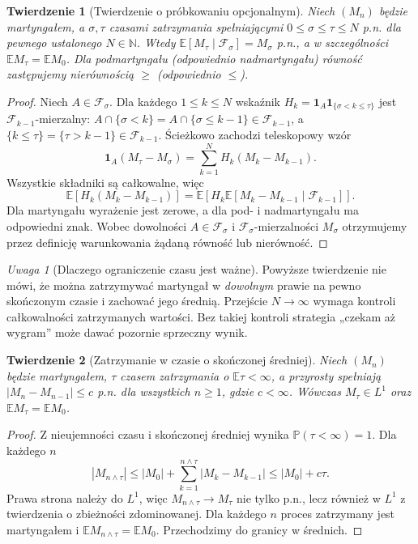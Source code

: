 \documentclass[11pt,a4paper,oneside]{report}
\numberwithin{equation}{chapter}
\theoremstyle{plain}
\newtheorem{twierdzenie}{Twierdzenie}[chapter]
\theoremstyle{definition}
\theoremstyle{remark}
\newtheorem{uwaga}{Uwaga}[chapter]
\newcommand{\N}{\mathbb{N}}
\newcommand{\Prob}{\mathbb{P}}
\newcommand{\E}{\mathbb{E}}
\newcommand{\ind}[1]{\mathbf{1}_{#1}}
\begin{document}
\begin{twierdzenie}[Twierdzenie o próbkowaniu opcjonalnym]
Niech $(M_n)$ będzie martyngałem, a $\sigma,\tau$
czasami zatrzymania spełniającymi
$0\leq\sigma\leq\tau\leq N$ p.n. dla pewnego
ustalonego $N\in\N$. Wtedy
$\E[M_\tau\mid\mathcal F_\sigma]=M_\sigma$ p.n.,
a w szczególności $\E M_\tau=\E M_0$.
Dla podmartyngału (odpowiednio nadmartyngału)
równość zastępujemy nierównością $\geq$
(odpowiednio $\leq$).
\end{twierdzenie}
\begin{proof}
Niech $A\in\mathcal F_\sigma$.
Dla każdego $1\leq k\leq N$ wskaźnik
$H_k=\ind A\ind{\{\sigma<k\leq\tau\}}$
jest $\mathcal F_{k-1}$-mierzalny:
$A\cap\{\sigma<k\}=A\cap\{\sigma\leq k-1\}
\in\mathcal F_{k-1}$,
a $\{k\leq\tau\}=\{\tau>k-1\}\in\mathcal F_{k-1}$.
Ścieżkowo zachodzi teleskopowy wzór
\[
\ind A(M_\tau-M_\sigma)
=\sum_{k=1}^N H_k(M_k-M_{k-1}).
\]
Wszystkie składniki są całkowalne, więc
\[
\E[H_k(M_k-M_{k-1})]
=\E[H_k\E[M_k-M_{k-1}\mid\mathcal F_{k-1}]].
\]
Dla martyngału wyrażenie jest zerowe,
a dla pod- i nadmartyngału ma odpowiedni znak.
Wobec dowolności $A\in\mathcal F_\sigma$
i $\mathcal F_\sigma$-mierzalności $M_\sigma$
otrzymujemy przez definicję warunkowania
żądaną równość lub nierówność.
\end{proof}

\begin{uwaga}[Dlaczego ograniczenie czasu jest ważne]
Powyższe twierdzenie nie mówi, że można zatrzymywać
martyngał w \emph{dowolnym} prawie na pewno
skończonym czasie i zachować jego średnią.
Przejście $N\to\infty$ wymaga kontroli
całkowalności zatrzymanych wartości.
Bez takiej kontroli strategia „czekam aż wygram”
może dawać pozornie sprzeczny wynik.
\end{uwaga}

\begin{twierdzenie}[Zatrzymanie w czasie o skończonej średniej]
Niech $(M_n)$ będzie martyngałem, $\tau$
czasem zatrzymania o $\E\tau<\infty$,
a przyrosty spełniają
$|M_n-M_{n-1}|\leq c$ p.n. dla wszystkich $n\geq1$,
gdzie $c<\infty$. Wówczas $M_\tau\in L^1$
oraz $\E M_\tau=\E M_0$.
\end{twierdzenie}
\begin{proof}
Z nieujemności czasu i skończonej średniej
wynika $\Prob(\tau<\infty)=1$. Dla każdego $n$
\[
|M_{n\wedge\tau}|
\leq|M_0|+\sum_{k=1}^{n\wedge\tau}|M_k-M_{k-1}|
\leq |M_0|+c\tau.
\]
Prawa strona należy do $L^1$, więc
$M_{n\wedge\tau}\to M_\tau$ nie tylko p.n.,
lecz również w $L^1$ z twierdzenia o zbieżności
zdominowanej. Dla każdego $n$ proces zatrzymany
jest martyngałem i $\E M_{n\wedge\tau}=\E M_0$.
Przechodzimy do granicy w średnich.
\end{proof}
\end{document}

